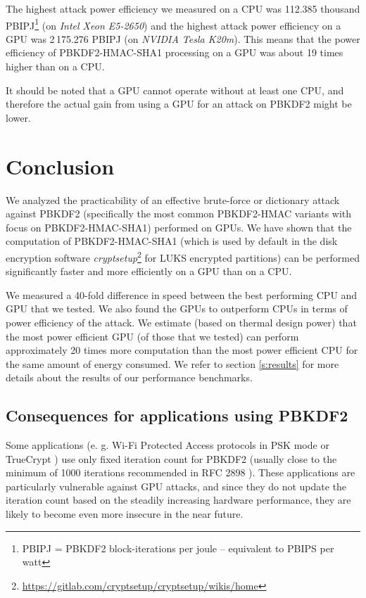 \documentclass[12pt,oneside]{fithesis2}
\begin{document}
      The highest attack power efficiency we measured on a CPU was 112.385 thousand PBIPJ\footnote{PBIPJ = PBKDF2 block-iterations per joule -- equivalent to PBIPS per watt} (on \emph{Intel Xeon E5-2650}) and the highest attack power efficiency on a GPU was 2\,175.276 PBIPJ (on \emph{NVIDIA Tesla K20m}). This means that the power efficiency of PBKDF2-HMAC-SHA1 processing on a GPU was about 19 times higher than on a CPU.
      
      It should be noted that a GPU cannot operate without at least one CPU, and therefore the actual gain from using a GPU for an attack on PBKDF2 might be lower.
      
    \chapter{Conclusion}
      We analyzed the practicability of an effective brute-force or dictionary attack against PBKDF2 (specifically the most common PBKDF2-HMAC variants with focus on PBKDF2-HMAC-SHA1) performed on GPUs. We have shown that the computation of PBKDF2-HMAC-SHA1 (which is used by default in the disk encryption software \emph{cryptsetup}\footnote{\url{https://gitlab.com/cryptsetup/cryptsetup/wikis/home}} for LUKS encrypted partitions) can be performed significantly faster and more efficiently on a GPU than on a CPU.
      
      We measured a 40-fold difference in speed between the best performing CPU and GPU that we tested. We also found the GPUs to outperform CPUs in terms of power efficiency of the attack. We estimate (based on thermal design power) that the most power efficient GPU (of those that we tested) can perform approximately 20 times more computation than the most power efficient CPU for the same amount of energy consumed. We refer to section \ref{s:results} for more details about the results of our performance benchmarks.
      
      \section{Consequences for applications using PBKDF2}
      Some applications (e. g. Wi-Fi Protected Access protocols in PSK mode \cite{rfc4764} or TrueCrypt \cite{truecrypt}) use only fixed iteration count for PBKDF2 (usually close to the minimum of 1000 iterations recommended in RFC 2898 \cite[section 4.2]{rfc2898}). These applications are particularly vulnerable against GPU attacks, and since they do not update the iteration count based on the steadily increasing hardware performance, they are likely to become even more insecure in the near future.
      
\end{document}
